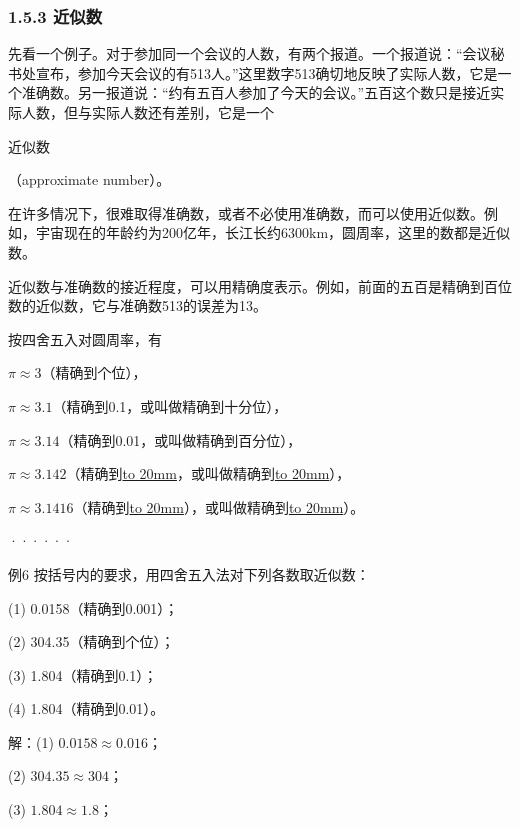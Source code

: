 \documentclass{article}
\begin{document}
\maketitle

\subsubsection*{1.5.3 近似数}

\begin{article}

先看一个例子。对于参加同一个会议的人数，有两个报道。一个报道说：“会议秘书处宣布，参加今天会议的有513人。”这里数字513确切地反映了实际人数，它是一个准确数。另一报道说：“约有五百人参加了今天的会议。”五百这个数只是接近实际人数，但与实际人数还有差别，它是一个\begin{definition}近似数\end{definition}（approximate number）。

在许多情况下，很难取得准确数，或者不必使用准确数，而可以使用近似数。例如，宇宙现在的年龄约为200亿年，长江长约6300km，圆周率，这里的数都是近似数。

近似数与准确数的接近程度，可以用精确度表示。例如，前面的五百是精确到百位数的近似数，它与准确数513的误差为13。

按四舍五入对圆周率，有

$\pi \approx 3$（精确到个位），

$\pi \approx 3.1$（精确到0.1，或叫做精确到十分位），

$\pi \approx 3.14$（精确到0.01，或叫做精确到百分位），

$\pi \approx 3.142$（精确到\underline{\hbox to 20mm}，或叫做精确到\underline{\hbox to 20mm}），

$\pi \approx 3.1416$（精确到\underline{\hbox to 20mm}），或叫做精确到\underline{\hbox to 20mm}）。

······

\begin{example}
例6 按括号内的要求，用四舍五入法对下列各数取近似数：

(1) 0.0158（精确到0.001）；

(2) 304.35（精确到个位）；

(3) 1.804（精确到0.1）；

(4) 1.804（精确到0.01）。

解：(1) $0.0158 \approx 0.016$；

(2) $304.35 \approx 304$；

(3) $1.804 \approx 1.8$；


\end{example}
\end{article}
\end{document}

